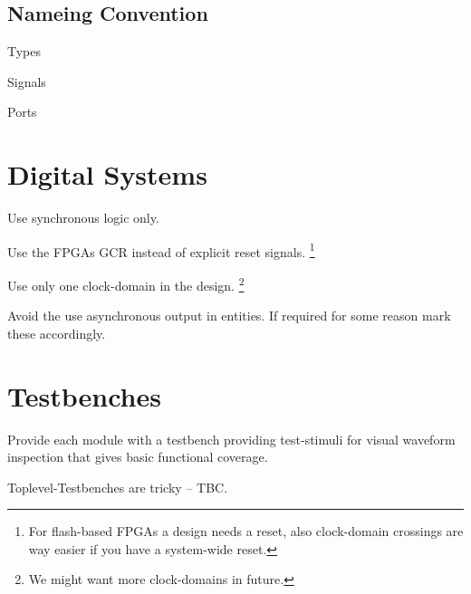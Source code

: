 

\subsection{Nameing Convention}

Types

Signals

Ports


\section{Digital Systems}

Use synchronous logic only.

Use the FPGAs GCR instead of explicit reset signals. \footnote{For flash-based FPGAs a design needs a reset, also clock-domain crossings are way easier if you have a system-wide reset.}

Use only one clock-domain in the design. \footnote{We might want more clock-domains in future.}

Avoid the use asynchronous output in entities. If required for some reason mark these accordingly.


\section{Testbenches}

Provide each module with a testbench providing test-stimuli for visual waveform inspection that gives basic functional coverage.

Toplevel-Testbenches are tricky -- TBC.


